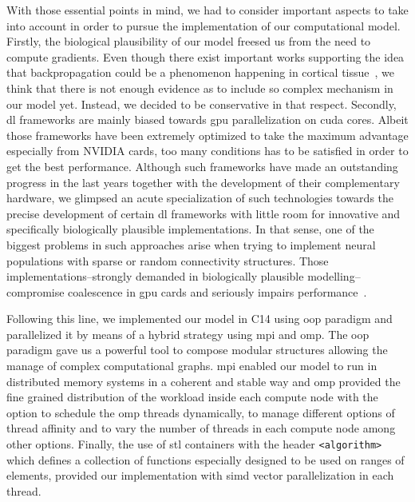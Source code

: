 \documentclass[10pt,journal,compsoc]{IEEEtran}
\newcommand{\CC}{C\nolinebreak\hspace{-.05em}\raisebox{.4ex}{\tiny\bf +}\nolinebreak\hspace{-.10em}\raisebox{.4ex}{\tiny\bf +}}
\begin{document}
With those essential points in mind, we had to consider important aspects to take into account in order to pursue the implementation of our computational model. Firstly, the biological plausibility of our model freesed us from the need to compute gradients. Even though there exist important works supporting the idea that backpropagation could be a phenomenon happening in cortical tissue~\cite{Guerguiev2017TowardsDL}, we think that there is not enough evidence as to include so complex mechanism in our model yet. Instead, we decided to be conservative in that respect. Secondly, \gls{dl} frameworks are mainly biased towards \gls{gpu} parallelization on \gls{cuda} cores. Albeit those frameworks have been extremely optimized to take the maximum advantage especially from NVIDIA cards, too many conditions has to be satisfied in order to get the best performance. Although such frameworks have made an outstanding progress in the last years together with the development of their complementary hardware, we glimpsed an acute specialization of such technologies towards the precise development of certain \gls{dl} frameworks with little room for innovative and specifically biologically plausible implementations. In that sense, one of the biggest problems in such approaches arise when trying to implement neural populations with sparse or random connectivity structures. Those implementations--strongly demanded in biologically plausible modelling--compromise coalescence in \gls{gpu} cards and seriously impairs performance~\cite{doi:10.3109/0954898X.2012.739292}.

Following this line, we implemented our model in \CC14 using \gls{oop} paradigm and parallelized it by means of a hybrid strategy using \gls{mpi} and \gls{omp}. The \gls{oop} paradigm gave us a powerful tool to compose modular structures allowing the manage of complex computational graphs. \gls{mpi} enabled our model to run in distributed memory systems in a coherent and stable way and \gls{omp} provided the fine grained distribution of the workload inside each compute node with the option to schedule the \gls{omp} threads dynamically, to manage different options of thread affinity and to vary the number of threads in each compute node among other options. Finally, the use of \gls{stl} containers with the header \texttt{<algorithm>} which defines a collection of functions especially designed to be used on ranges of elements, provided our implementation with \gls{simd} vector parallelization in each thread.
\end{document}
